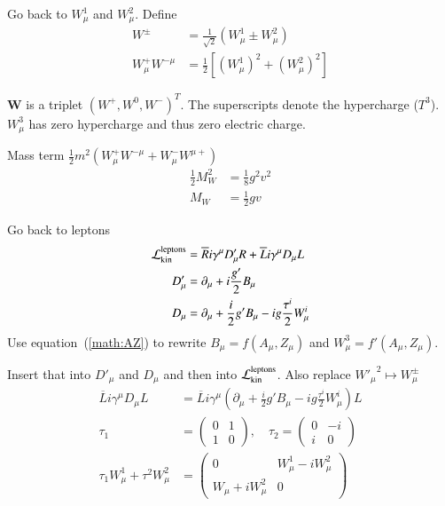 Go back to $W^1_\mu$ and $W^2_\mu$. Define
\begin{align}
   W^\pm &= \frac{1}{\sqrt{2}} (W_\mu^1 \pm W_\mu^2) \\
   W^+_\mu W^{- \mu} &= \frac{1}{2} \left[ (W_\mu^1)^2 + (W_\mu^2)^2 \right]
\end{align}

$\pmb W$ is a triplet $(W^+, W^0,  W^-)^T $. The superscripts denote the hypercharge ($T^3$). $W^3_\mu$ has zero hypercharge and thus zero electric charge.

Mass term $\frac{1}{2} m^2 (W_\mu^+ W^{- \mu} + W^-_\mu W^{\mu +})$
\begin{align*}
   \frac{1}{2} M_W^2 &= \frac{1}{8} g^2 v^2 \\
   M_W &= \frac{1}{2} g v
\end{align*}

Go back to leptons
\begin{align*}
   \mathcal{L}_{\text{kin}}^\text{leptons} &= \overline{R} i \gamma^\mu D'_\mu R + \overline{L} i \gamma^\mu D_\mu L \\
   D'_\mu &= \partial_\mu + i \frac{g'}{2} B_\mu \\
   D_\mu &= \partial_\mu + \frac{i}{2} g' B_\mu - ig \frac{\tau^i}{2} W_\mu^i
\end{align*}
Use equation~(\ref{math:AZ}) to rewrite $B_\mu = f(A_\mu, Z_\mu)$ and $W_\mu^3 = f'(A_\mu, Z_\mu)$.

Insert that into $D'_\mu$ and $D_\mu$ and then into $\mathcal{L}_\text{kin}^\text{leptons}$. Also replace ${W'_\mu}^2 \mapsto W_\mu^{\pm}$
\begin{align*}
   \overline{L} i \gamma^\mu D_\mu L &= \overline{L} i \gamma^\mu  \left( \partial_\mu + \frac{i}{2} g' B_\mu - ig \frac{\tau^i}{2} W_\mu^i \right) L \\
   \tau_1 &= \begin{pmatrix} 0 & 1 \\ 1 & 0 \end{pmatrix}, \quad \tau_2 = \begin{pmatrix} 0 & -i \\ i & 0\end{pmatrix} \\
   \tau_1 W^1_\mu + \tau^2 W_\mu^2 &= \begin{pmatrix} 0 & W_\mu^1 - iW_\mu^2 \\ W_\mu + iW_\mu^2 & 0 \end{pmatrix}
\end{align*}

